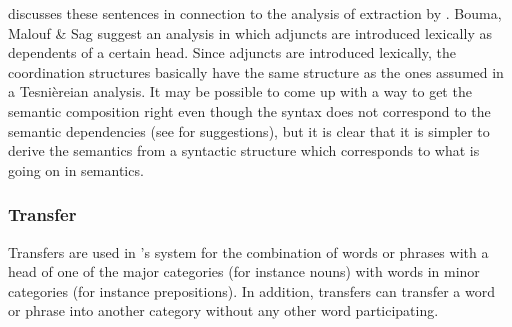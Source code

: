 \citet[]{Levine2003a} discusses these sentences in connection to the \hpsg analysis of
extraction by \citet*{BMS2001a}. Bouma, Malouf \& Sag suggest an analysis in which adjuncts are
introduced lexically as dependents of a certain head. Since adjuncts are introduced lexically, the
coordination structures basically have the same structure as the ones assumed in a
Tesnièreian analysis. It may be possible to come up with a way to get the semantic composition right
even though the syntax does not correspond to the semantic dependencies (see \citealp{Chaves2009a} for
suggestions), but it is clear that it is simpler to derive the semantics from a syntactic structure
which corresponds to what is going on in semantics. 

\subsubsection{Transfer}
\label{sec-transfer-dg}

\largerpage[-1]
Transfers are used in \tes's system for the combination of words or phrases with a head of one of
the major categories (for instance nouns) with words in minor categories (for instance
prepositions). In addition, transfers can transfer a word or phrase into another category without
any other word participating.

